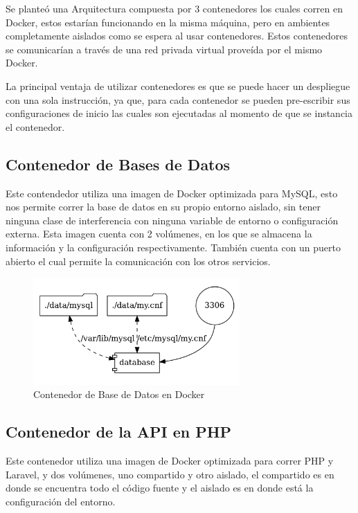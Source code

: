 Se planteó una Arquitectura compuesta por 3 contenedores los cuales corren en Docker, estos estarían funcionando en la misma máquina, pero en ambientes completamente aislados como se espera al usar contenedores. Estos contenedores se comunicarían a través de una red privada virtual proveída por el mismo Docker.

La principal ventaja de utilizar contenedores es que se puede hacer un despliegue con una sola instrucción, ya que, para cada contenedor se pueden pre-escribir sus configuraciones de inicio las cuales son ejecutadas al momento de que se instancia el contenedor. 

\subsection{Contenedor de Bases de Datos}
Este contendedor utiliza una imagen de Docker optimizada para MySQL, esto nos permite correr la base de datos en su propio entorno aislado, sin tener ninguna clase de interferencia con ninguna variable de entorno o configuración externa.
Esta imagen cuenta con 2 volúmenes, en los que se almacena la información y la configuración respectivamente. También cuenta con un puerto abierto el cual permite la comunicación con los otros servicios.

\begin{figure}[H]
    \centering
    \includegraphics[width=0.7\textwidth]{img/db_container.png}
    \caption{Contenedor de Base de Datos en Docker }
\end{figure}

\subsection{Contenedor de la API en PHP}
Este contenedor utiliza una imagen de Docker optimizada para correr PHP y Laravel, y dos volúmenes, uno compartido y otro aislado, el compartido es en donde se encuentra todo el código fuente y el aislado es en donde está la configuración del entorno.

